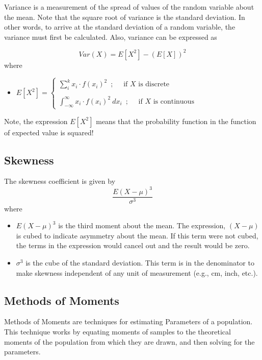 \documentclass{article}
\begin{document}
Variance is a measurement of the spread of values of the random variable about the mean. Note that the square root of variance is the standard deviation. In other words, to arrive at the standard deviation of a random variable, the variance must first be calculated. Also, variance can be expressed as

$$
Var(X) = E[X^2] - (E[X])^2
$$
where

\begin{itemize}
    \item $E[X^2] = \begin{cases} \sum_{i}^{k} x_i \cdot f(x_i)^2 \enspace ; \quad \text{ if } X \text{ is discrete} \\ \\ \int_{-\infty}^{\infty} x_i \cdot f(x_i)^2 \: dx_i \enspace ; \quad \text{ if } X \text{ is continuous} \end{cases}$
\end{itemize}

Note, the expression $E[X^2]$ means that the probability function in the function of expected value is squared!

\subsection{Skewness}
The skewness coefficient is given by
$$
\frac{E(X-\mu)^3}{\sigma^3}
$$
where

\begin{itemize}
    \item $E(X-\mu)^3$ is the third moment about the mean. The expression, $(X-\mu)$ is cubed to indicate asymmetry about the mean. If this term were not cubed, the terms in the expression would cancel out and the result would be zero.
    \item $\sigma^3$ is the cube of the standard deviation. This term is in the denominator to make skewness independent of any unit of measurement (e.g., cm, inch, etc.).
\end{itemize}

\subsection{Methods of Moments}
Methods of Moments are techniques for estimating Parameters of a population. This technique works by equating moments of samples to the theoretical moments of the population from which they are drawn, and then solving for the parameters.
\end{document}
